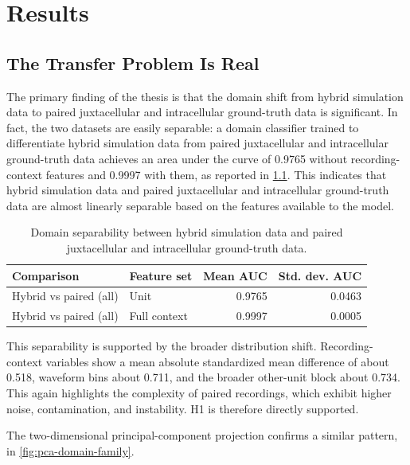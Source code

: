 \chapter{Results}
\label{chap:results}

\section{The Transfer Problem Is Real}

The primary finding of the thesis is that the domain shift from hybrid simulation data to paired juxtacellular and intracellular ground-truth data is significant. In fact, the two datasets are easily separable: a domain classifier trained to differentiate hybrid simulation data from paired juxtacellular and intracellular ground-truth data achieves an area under the curve of 0.9765 without recording-context features and 0.9997 with them, as reported in \cref{tab:domain-separability}. This indicates that hybrid simulation data and paired juxtacellular and intracellular ground-truth data are almost linearly separable based on the features available to the model.

\begin{table}[H]
    \centering
    \caption{Domain separability between hybrid simulation data and paired juxtacellular and intracellular ground-truth data.}
    \label{tab:domain-separability}
    \begin{tabular}{llrr}
        \toprule
        Comparison & Feature set & Mean AUC & Std. dev. AUC \\
        \midrule
        Hybrid vs paired (all) & Unit & 0.9765 & 0.0463 \\
        Hybrid vs paired (all) & Full context & 0.9997 & 0.0005 \\
        \bottomrule
    \end{tabular}
\end{table}

This separability is supported by the broader distribution shift. Recording-context variables show a mean absolute standardized mean difference of about 0.518, waveform bins about 0.711, and the broader other-unit block about 0.734. This again highlights the complexity of paired recordings, which exhibit higher noise, contamination, and instability. H1 is therefore directly supported.

The two-dimensional principal-component projection confirms a similar pattern, in \cref{fig:pca-domain-family}.


